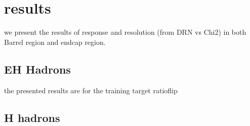 \section{results}
we present the results of response and resolution (from DRN vs Chi2) in  both Barrel region and endcap region.

\subsection{EH Hadrons}
the presented results are for the training target ratioflip





\subsection{H hadrons}




